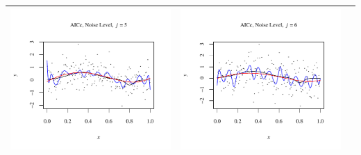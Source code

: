 \documentclass[11pt]{article}
\begin{document}
\begin{table}[h!]
\begin{center}
\begin{tabular}{| >{\centering\arraybackslash}m{2.1in} |  >{\centering\arraybackslash}m{2.1in} |  >{\centering\arraybackslash}m{2.1in}|}
      \includegraphics[width=1\linewidth,height=0.18\textheight]{Graphs/3/1/assignment5_a_3_1_5}&
      \includegraphics[width=1\linewidth,height=0.18\textheight]{Graphs/3/1/assignment5_a_3_1_6}\\\hline
    \end{tabular}
  \end{center}
\end{table}
\end{document}
